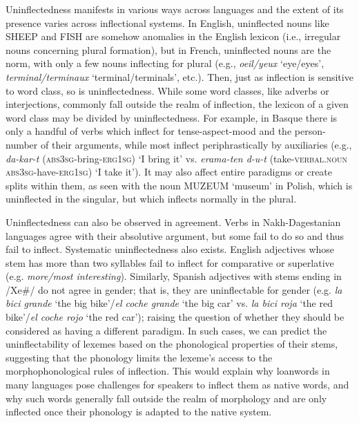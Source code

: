 \documentclass[output=paper]{langscibook}
\begin{document}
  Uninflectedness manifests in various ways across languages and the extent of its presence varies across inflectional systems. In English, uninflected nouns like SHEEP and FISH are somehow anomalies in the English lexicon (i.e., irregular nouns concerning plural formation), but in French, uninflected nouns are the norm, with only a few nouns inflecting for plural (e.g., \textit{oeil/yeux} ‘eye/eyes’, \textit{terminal/terminaux} ‘terminal/terminals’, etc.). Then, just as inflection is sensitive to word class, so is uninflectedness. While some word classes, like adverbs or interjections, commonly fall outside the realm of inflection, the lexicon of a given word class may be divided by uninflectedness. For example, in Basque there is only a handful of verbs which inflect for tense-aspect-mood and the person-number of their arguments, while most inflect periphrastically by auxiliaries (e.g., \textit{da-kar-t} (\textsc{abs3sg}{}-bring-\textsc{erg1sg}) ‘I bring it’  vs. \textit{erama-ten d-u-t} (take\textsc{{}-verbal.noun} \textsc{abs3sg}{}-have-\textsc{erg1sg}) ‘I take it’). It may also affect entire paradigms or create splits within them, as seen with the noun MUZEUM ‘museum’ in Polish, which is uninflected in the singular, but which inflects normally in the plural. 

  Uninflectedness can also be observed in agreement. Verbs in Nakh-Dagestanian languages agree with their absolutive argument, but some fail to do so and thus fail to inflect. Systematic uninflectedness also exists. English adjectives whose stem has more than two syllables fail to inflect for comparative or superlative (e.g. \textit{more/most interesting}). Similarly, Spanish adjectives with stems ending in /Xe\#/ do not agree in gender; that is, they are uninflectable for gender (e.g. \textit{la bici grande} ‘the big bike’/\textit{el coche grande} ‘the big car’ vs. \textit{la bici roja} ‘the red bike’/\textit{el coche rojo} ‘the red car’); raising the question of whether they should be considered as having a different paradigm. In such cases, we can predict the uninflectability of lexemes based on the phonological properties of their stems, suggesting that the phonology limits the lexeme's access to the morphophonological rules of inflection. This would explain why loanwords in many languages pose challenges for speakers to inflect them as native words, and why such words generally fall outside the realm of morphology and are only inflected once their phonology is adapted to the native system. 
\end{document}
